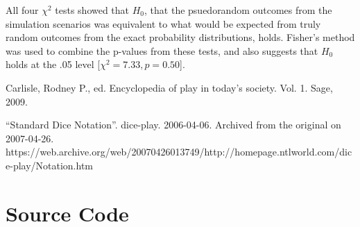 \documentclass{article}
\begin{document}
All four $\chi^2$ tests showed that $H_0$, that the psuedorandom outcomes from the simulation scenarios was equivalent to what would be expected from truly random outcomes from the exact probability distributions, holds. Fisher's method was used to combine the p-values from these tests, and also suggests that $H_0$ holds at the .05 level [$\chi^2=7.33, p=0.50$].


%
\begin{thebibliography}{1}

Carlisle, Rodney P., ed. Encyclopedia of play in today's society. Vol. 1. Sage, 2009.

``Standard Dice Notation''. dice-play. 2006-04-06. Archived from the original on 2007-04-26. https://web.archive.org/web/20070426013749/http://homepage.ntlworld.com/dice-play/Notation.htm

\end{thebibliography}

\appendix{}               %

\section{Source Code}        %



\end{document}
